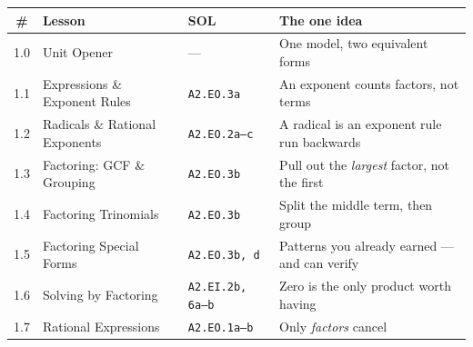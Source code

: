 \boxguard[14]
\begin{tocbox}
\small
\renewcommand{\arraystretch}{1.32}
\begin{tabularx}{\linewidth}{@{} c >{\raggedright\arraybackslash}p{5.5cm} l X @{}}
\rowcolor{mist}
\textbf{\#} & \textbf{Lesson} & \textbf{SOL} & \textbf{The one idea} \\
\midrule
1.0 & Unit Opener                    & ---                 & One model, two equivalent forms \\
1.1 & Expressions \& Exponent Rules  & \texttt{A2.EO.3a}   & An exponent counts factors, not terms \\
1.2 & Radicals \& Rational Exponents & \texttt{A2.EO.2a--c}& A radical is an exponent rule run backwards \\
1.3 & Factoring: GCF \& Grouping     & \texttt{A2.EO.3b}   & Pull out the \emph{largest} factor, not the first \\
1.4 & Factoring Trinomials           & \texttt{A2.EO.3b}   & Split the middle term, then group \\
1.5 & Factoring Special Forms        & \texttt{A2.EO.3b, d}& Patterns you already earned --- and can verify \\
1.6 & Solving by Factoring           & \texttt{A2.EI.2b, 6a--b} & Zero is the only product worth having \\
1.7 & Rational Expressions           & \texttt{A2.EO.1a--b}& Only \emph{factors} cancel \\
\end{tabularx}
\end{tocbox}

\vspace{0.12in}

